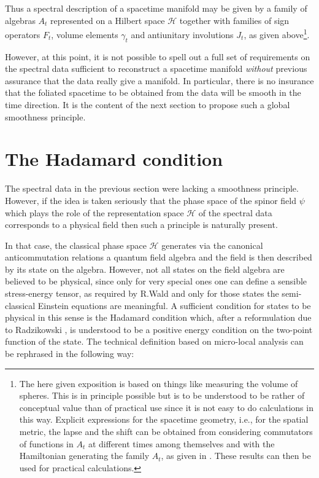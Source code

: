 \documentclass[a4paper,10pt,oneside]{amsart}
\theoremstyle{plain}
\theoremstyle{definition}
\theoremstyle{remark}
\begin{document}
Thus a spectral description of a spacetime manifold may be given
by a family of algebras ${A}_{t}$ represented on a Hilbert space
$\mathcal{H}$ together with families of sign operators ${F}_{t}$,
volume elements ${\gamma}_{t}$ and antiunitary involutions
${J}_{t}$, as given above\footnote{The here given exposition is
based on things like measuring the volume of spheres. This is in
principle possible but is to be understood to be rather of
conceptual value than of practical use since it is not easy to do
calculations in this way. Explicit expressions for the spacetime
geometry, i.e., for the spatial metric, the lapse and the shift
can be obtained from considering commutators of functions in
${A}_{t}$ at different times among themselves and with the
Hamiltonian generating the family ${A}_{t}$, as given in
\cite{Kopf-Paschke2000}. These results can then be used for
practical calculations.}.




However, at this point, it is not possible to spell out a full set
of requirements on the spectral data sufficient to reconstruct a
spacetime manifold {\em without} previous assurance that the data
really give a manifold. In particular, there is no insurance that
the foliated spacetime to be obtained from the data will be smooth
in the time direction. It is the content of the next section to
propose such a global smoothness
principle.



\section{The Hadamard condition}\label{hadamard}


The spectral data in the previous section were lacking a
smoothness principle. However, if the idea is taken seriously
that the phase space of the spinor field $\psi$ which plays the
role of the representation space $\mathcal{H}$ of the spectral
data corresponds to a physical field then such a principle is
naturally present.

In that case, the classical phase space $\mathcal{H}$ generates
via the canonical anticommutation relations a quantum field
algebra and the field is then described by its state on the
algebra. However, not all states on the field algebra are believed
to be physical, since only for very special ones one can define a
sensible stress-energy tensor, as required by R.Wald \cite{Wald1977}
and only for
those states the semi-classical Einstein equations are meaningful.
A sufficient condition for states to be physical in this sense is
the Hadamard condition
\cite{Wald1978a,Wald1978b,Fulling-Sweeny-Wald,Fulling-Narcowich-Wald,
Kay-Wald,Verch1994,Radzikowski1996a,Radzikowski1996b,Junker,Wellmann,
Hollands1999a,Hollands1999b}
 which, after a
reformulation due to Radzikowski
\cite{Radzikowski1996a,Radzikowski1996b}, is understood to be a
positive energy condition on the two-point function of the state.
The technical definition based on micro-local analysis can be
rephrased in the following way:
\end{document}
